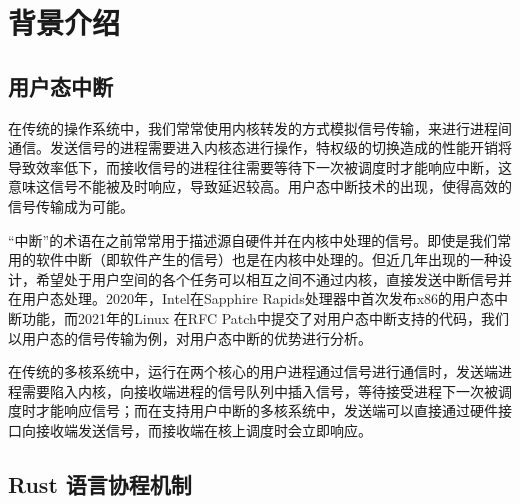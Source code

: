 \section{背景介绍}

\subsection{用户态中断}

在传统的操作系统中，我们常常使用内核转发的方式模拟信号传输，来进行进程间通信。发送信号的进程需要进入内核态进行操作，特权级的切换造成的性能开销将导致效率低下，而接收信号的进程往往需要等待下一次被调度时才能响应中断，这意味这信号不能被及时响应，导致延迟较高。用户态中断技术的出现，使得高效的信号传输成为可能。

“中断”的术语在之前常常用于描述源自硬件并在内核中处理的信号。即使是我们常用的软件中断（即软件产生的信号）也是在内核中处理的。但近几年出现的一种设计，希望处于用户空间的各个任务可以相互之间不通过内核，直接发送中断信号并在用户态处理。2020年，Intel在Sapphire Rapids处理器中首次发布x86的用户态中断功能，而2021年的Linux 在RFC Patch中提交了对用户态中断支持的代码，我们以用户态的信号传输为例，对用户态中断的优势进行分析。

在传统的多核系统中，运行在两个核心的用户进程通过信号进行通信时，发送端进程需要陷入内核，向接收端进程的信号队列中插入信号，等待接受进程下一次被调度时才能响应信号；而在支持用户中断的多核系统中，发送端可以直接通过硬件接口向接收端发送信号，而接收端在核上调度时会立即响应。

\subsection{Rust 语言协程机制}
